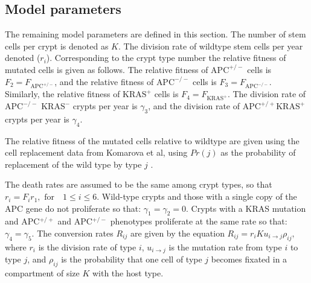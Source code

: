 
\subsection{Model parameters}

The remaining model parameters are defined in this section.
The number of stem cells per crypt is denoted as $K$.
The division rate of wildtype stem cells per year denoted ($r_i$). Corresponding to the crypt type number the relative fitness of mutated cells is given as follows.
The relative fitness of \( \text{APC}^{+/-} \) cells is \( F_2 = F_{\text{APC}^{+/-}} \), 
and the relative fitness of \( \text{APC}^{-/-} \) cells is \( F_3 = F_{\text{APC}^{-/-}} \). 
Similarly, the relative fitness of \( \text{KRAS}^{+} \) cells is \( F_4 = F_{\text{KRAS}^+} \). 
The division rate of \( \text{APC}^{-/-} \) \(\text{KRAS}^{-} \) crypts per year is \( \gamma_3 \), and the division rate of \( \text{APC}^{+/+} \)\( \text{KRAS}^{+} \) crypts per year is \( \gamma_4 \). 


The relative fitness of the mutated cells relative to wildtype are given using the cell replacement data from  Komarova et al, using $Pr(j)$ as the probability of replacement of the wild type by type $j$ \autocite{DynamicsOfGeneticInstabilityInSporadicAndFamilialcolorectalCancer}.

The death rates are assumed to be the same among crypt types, so that $r_i = F_i r_1, \text{ for} \quad 1 \leq i \leq 6.$
Wild-type crypts and those with a single copy of the APC gene do not proliferate so that: 
$\gamma_1 = \gamma_2 = 0.$
Crypts with a KRAS mutation and APC$^{+/+}$ and APC$^{+/-}$ phenotypes proliferate at the same rate so that:
$ \gamma_4 = \gamma_5. $
The conversion rates $R_{ij}$ are given by the equation
$R_{ij} = r_i Ku_{i \to j} \rho_{ij},$
where \( r_i \) is the division rate of type \(i\), \( u_{i \to j} \) is the mutation rate from type \(i\) to type \(j\), and \( \rho_{ij} \) is the probability that one cell of type \(j\) becomes fixated in a compartment of size \(K\) with the host type. 

